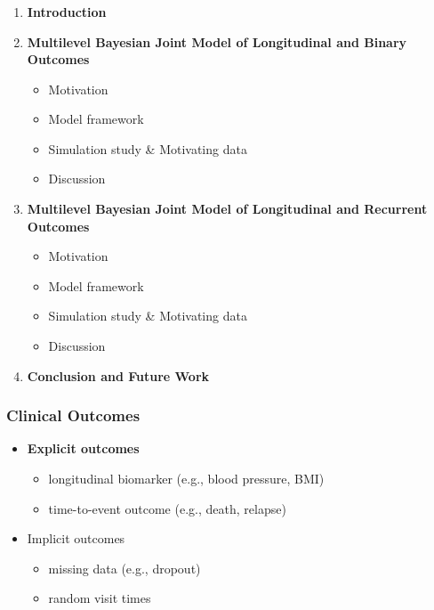 \documentclass[fleqn]{beamer}
\begin{document}
\begin{frame}
\frametitle{}
\begin{enumerate}
    \item \textbf{Introduction}
    \item<0> \textbf{Multilevel Bayesian Joint Model of Longitudinal and Binary Outcomes}
    \begin{itemize}
        \item Motivation
        \item Model framework
        \item Simulation study \& Motivating data
        \item Discussion
    \end{itemize}
    \item<0> \textbf{Multilevel Bayesian Joint Model of Longitudinal and Recurrent Outcomes}
    \begin{itemize}
        \item Motivation
        \item Model framework
        \item Simulation study \& Motivating data
        \item Discussion
    \end{itemize}
    \item<0> \textbf{Conclusion and Future Work}
\end{enumerate}
\end{frame}

\begin{frame}
\frametitle{Clinical Outcomes}
\begin{itemize}
   \item \textbf{Explicit outcomes}
    \begin{itemize}
        \item longitudinal biomarker (e.g., blood pressure, BMI) 
        \item time-to-event outcome (e.g., death, relapse) 
    \end{itemize}
   \item Implicit outcomes
        \begin{itemize}
            \item missing data (e.g., dropout)
            \item random visit times
        \end{itemize}
    \end{itemize}

\end{frame}
\end{document}
